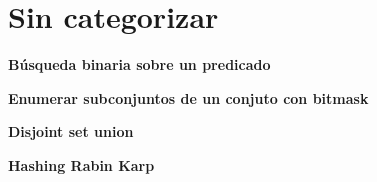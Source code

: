 \section{Sin categorizar}
    \textbf{Búsqueda binaria sobre un predicado}
    

    \textbf{Enumerar subconjuntos de un conjuto con bitmask}
    

    \textbf{Disjoint set union}
    

    \textbf{Hashing Rabin Karp}
    